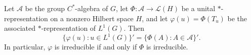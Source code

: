 \begin{lemma}
Let $\mathcal{A}$ be the group $C^*$-algebra of $G$, let $\Phi: \mathcal{A} \to \mathcal{L}(H)$ be a unital $*$-representation on a nonzero Hilbert space $H$, and let $\varphi(u) = \Phi(T_u)$ be the associated $*$-representation of $L^1(G)$. Then
$$\{\varphi(u) : u \in L^1(G)\}' = \{\Phi(A) : A \in \mathcal{A}\}'.$$
In particular, $\varphi$ is irreducible if and only if $\Phi$ is irreducible.
\end{lemma}
